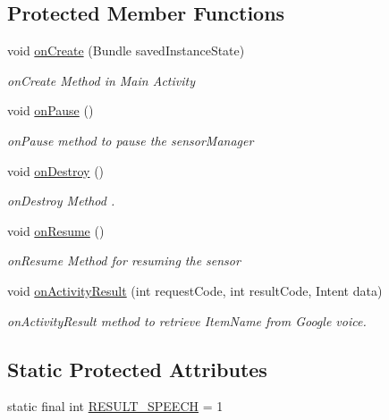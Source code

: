 \subsection*{Protected Member Functions}
\begin{DoxyCompactItemize}
\item 
void \hyperlink{classcom_1_1example_1_1santh_1_1shoppinglist_1_1_main_activity_a09c4339b395c390420f5a3f5a2ef0e90}{on\+Create} (Bundle saved\+Instance\+State)
\begin{DoxyCompactList}\small\item\em on\+Create Method in Main Activity \end{DoxyCompactList}\item 
void \hyperlink{classcom_1_1example_1_1santh_1_1shoppinglist_1_1_main_activity_a6567abea3528c5e3e3e523ecead734c8}{on\+Pause} ()
\begin{DoxyCompactList}\small\item\em on\+Pause method to pause the sensor\+Manager \end{DoxyCompactList}\item 
void \hyperlink{classcom_1_1example_1_1santh_1_1shoppinglist_1_1_main_activity_aadfa7e9478d4a45e273f9ccbc8539100}{on\+Destroy} ()
\begin{DoxyCompactList}\small\item\em on\+Destroy Method . \end{DoxyCompactList}\item 
void \hyperlink{classcom_1_1example_1_1santh_1_1shoppinglist_1_1_main_activity_a2e421cbd8b1ce8efc186b39fdca245ac}{on\+Resume} ()
\begin{DoxyCompactList}\small\item\em on\+Resume Method for resuming the sensor \end{DoxyCompactList}\item 
void \hyperlink{classcom_1_1example_1_1santh_1_1shoppinglist_1_1_main_activity_abbd9519fe806e438184036e3e450ea11}{on\+Activity\+Result} (int request\+Code, int result\+Code, Intent data)
\begin{DoxyCompactList}\small\item\em on\+Activity\+Result method to retrieve Item\+Name from Google voice. \end{DoxyCompactList}\end{DoxyCompactItemize}
\subsection*{Static Protected Attributes}
\begin{DoxyCompactItemize}
\item 
static final int \hyperlink{classcom_1_1example_1_1santh_1_1shoppinglist_1_1_main_activity_a4f358ad66f8020173b2bac71b406a1d5}{R\+E\+S\+U\+L\+T\+\_\+\+S\+P\+E\+E\+CH} = 1
\end{DoxyCompactItemize}


